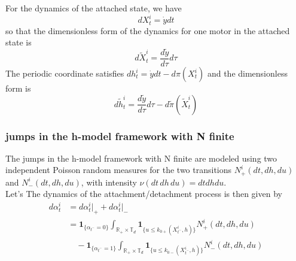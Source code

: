 \documentclass{article}
\begin{document}
For the dynamics of the attached state, we have
\begin{equation}
    dX_t^i = \dot{y} dt
\end{equation}
so that the dimensionless form of the dynamics for one motor in the attached state is
\begin{equation}
    d\tilde{X}_t^i = \frac{d\tilde{y}}{d\tau} d\tau
\end{equation}
The periodic coordinate satisfies $dh_t^i = \dot{y} dt - d\pi(X_t^i)$ and the dimensionless form is
\begin{equation}
    d\tilde{h}_t^i = \frac{d\tilde{y}}{d\tau} d\tau - d\tilde{\pi}(\tilde{X}_t^i)
\end{equation}


\subsubsection{jumps in the h-model framework with N finite}
The jumps in the h-model framework with N finite are modeled using two independent Poisson random measures for the two transitions $N_+^i(dt,dh,du)$ and $N_-^i(dt,dh,du)$, with intensity $\nu(dt\,dh\,du) = dtdhdu$.\\
Let's The dynamics of the attachment/detachment process is then given by
\begin{equation}
\begin{aligned}
d\alpha_t^i &= d\alpha_t^i\Big|_+ + d\alpha_t^i\Big|_- \\
&= \mathbf{1}_{\{\alpha_{t^-}=0\}} \int_{\mathbb{R}_+ \times \mathbb{T}_d} \mathbf{1}_{\{u \le k_{0+}(X_{t^-}^i, h)\}} N_+^i(dt, dh, du) \\
&\quad - \mathbf{1}_{\{\alpha_{t^-}=1\}} \int_{\mathbb{R}_+ \times \mathbb{T}_d} \mathbf{1}_{\{u \le k_{0-}(X_{t^-}^i, h)\}} N_-^i(dt, dh, du)
\end{aligned}
\end{equation}
\end{document}
